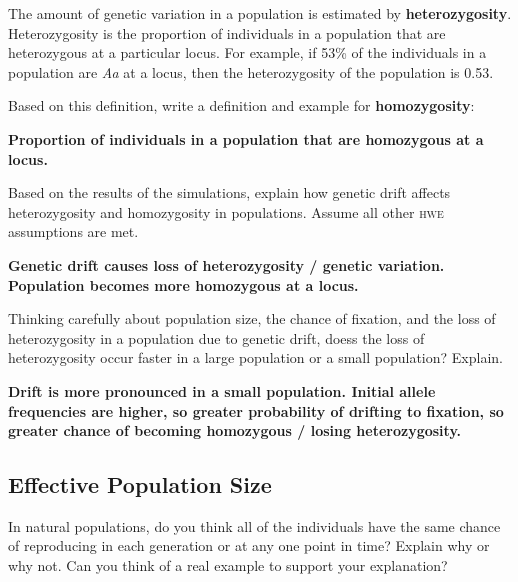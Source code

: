 \documentclass[11pt, addpoints, hidelinks]{exam}
\begin{document}
\begin{questions}
The amount of genetic variation in a population is estimated by
\textbf{heterozygosity}. Heterozygosity is the proportion of individuals
in a population that are heterozygous at a particular locus. For
example, if 53\% of the individuals in a population are \emph{Aa} at a
locus, then the heterozygosity of the population is 0.53.


\question[1] Based on this definition, write a definition and example
for \textbf{homozygosity}:

\begin{minipage}[t][2.5cm]{\textwidth}
	\ifprintanswers
		\textbf{Proportion of individuals in a population that are homozygous at a locus.}
	\fi
\end{minipage}

\newpage

\question[2] Based on the results of the simulations, explain how
genetic drift affects heterozygosity and homozygosity in populations.
Assume all other \textsc{hwe} assumptions are met.

\begin{minipage}[t][5cm]{\textwidth}
	\ifprintanswers
		\textbf{Genetic drift causes loss of heterozygosity / genetic variation.  Population becomes more homozygous at a locus.}
	\fi
\end{minipage}


\question[2] Thinking carefully about population size, the chance of
fixation, and the loss of heterozygosity in a population due to genetic
drift, doess the loss of heterozygosity occur faster in a
large population or a small population? Explain.

\begin{minipage}[t][5cm]{\textwidth}
	\ifprintanswers
		\textbf{Drift is more pronounced in a small population.  Initial allele frequencies are higher, so greater probability of drifting to fixation, so greater chance of becoming homozygous / losing heterozygosity.}
	\fi
\end{minipage}

\subsection*{Effective Population Size}

\question[1] In natural populations, do you think all of the individuals
have the same chance of reproducing in each generation or at any one
point in time? Explain why or why not. Can you think of a real example
to support your explanation?


\end{questions}
\end{document}
